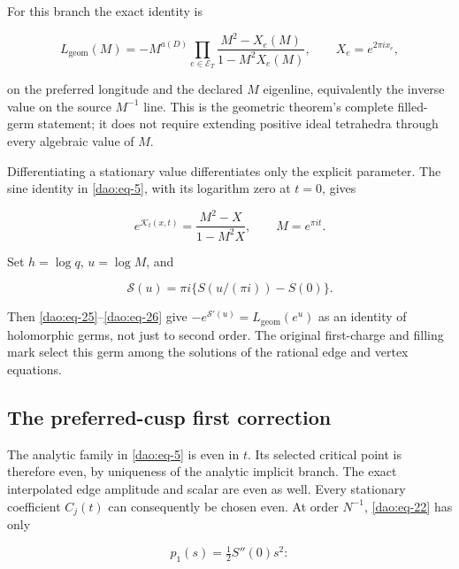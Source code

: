 For this branch the exact identity is

\begin{equation}\label{dao:eq-25}
L_{\mathrm{geom}}(M)
   =-M^{a(D)}\prod_{e\in\mathcal E_T}
               \frac{M^2-X_e(M)}{1-M^2X_e(M)},
       \qquad X_e=e^{2\pi ix_e},
\end{equation}

on the preferred longitude and the declared \(M\) eigenline, equivalently the inverse value on the source \(M^{-1}\) line. This is the geometric theorem's complete filled-germ statement; it does not require extending positive ideal tetrahedra through every algebraic value of \(M\).

Differentiating a stationary value differentiates only the explicit parameter. The sine identity in \eqref{dao:eq-5}, with its logarithm zero at \(t=0\), gives

\begin{equation}\label{dao:eq-26}
e^{\mathcal K_t(x,t)}=\frac{M^2-X}{1-M^2X},
                  \qquad M=e^{\pi it}.
\end{equation}

Set \(h=\log q\), \(u=\log M\), and

\begin{equation}\label{dao:eq-27}
\mathcal S(u)=\pi i\{S(u/(\pi i))-S(0)\}.
\end{equation}

Then \eqref{dao:eq-25}--\eqref{dao:eq-26} give \(-e^{\mathcal S'(u)}=L_{\mathrm{geom}}(e^u)\) as an identity of holomorphic germs, not just to second order. The original first-charge and filling mark select this germ among the solutions of the rational edge and vertex equations.

\subsection{The preferred-cusp first correction}\label{dao:cusp-correction}

The analytic family in \eqref{dao:eq-5} is even in \(t\). Its selected critical point is therefore even, by uniqueness of the analytic implicit branch. The exact interpolated edge amplitude and scalar are even as well. Every stationary coefficient \(C_j(t)\) can consequently be chosen even. At order \(N^{-1}\), \eqref{dao:eq-22} has only

\begin{equation}\label{dao:eq-27a}
p_1(s)=\tfrac12 S''(0)s^2:
\end{equation}

